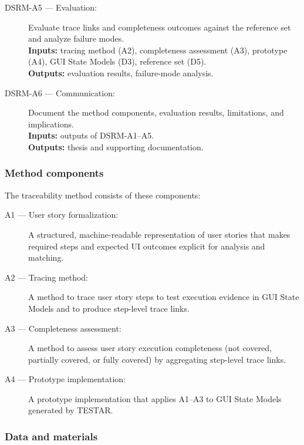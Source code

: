 \documentclass{ou-report-vaf}
\begin{document}
\begin{description}
    \item[DSRM-A5 --- Evaluation:]
    Evaluate trace links and completeness outcomes against the reference set and analyze failure modes. \\
    \textbf{Inputs:} tracing method (A2), completeness assessment (A3), prototype (A4), GUI State Models (D3), reference set (D5). \\
    \textbf{Outputs:} evaluation results, failure-mode analysis.

    \item[DSRM-A6 --- Communication:]
    Document the method components, evaluation results, limitations, and implications. \\
    \textbf{Inputs:} outputs of DSRM-A1--A5. \\
    \textbf{Outputs:} thesis and supporting documentation.
\end{description}

\subsubsection{Method components}
\label{subsubsec:artifacts}

The traceability method consists of these components:

\begin{description}
    \item[A1 --- User story formalization:]
    A structured, machine-readable representation of user stories that makes required steps and expected UI outcomes explicit for analysis and matching.

    \item[A2 --- Tracing method:]
    A method to trace user story steps to test execution evidence in GUI State Models and to produce step-level trace links.

    \item[A3 --- Completeness assessment:]
    A method to assess user story execution completeness (not covered, partially covered, or fully covered) by aggregating step-level trace links.

    \item[A4 --- Prototype implementation:]
    A prototype implementation that applies A1--A3 to GUI State Models generated by TESTAR.
\end{description}

\subsubsection{Data and materials}
\label{subsubsec:data-materials}
\end{document}
